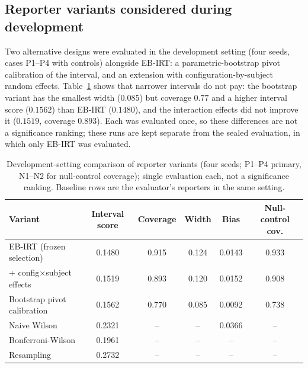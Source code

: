 \documentclass{article}
\begin{document}
\subsection{Reporter variants considered during development}
Two alternative designs were evaluated in the development setting (four seeds, cases P1--P4 with controls) alongside EB-IRT: a parametric-bootstrap pivot calibration of the interval, and an extension with configuration-by-subject random effects. Table~\ref{tab:variants} shows that narrower intervals do not pay: the bootstrap variant has the smallest width ($0.085$) but coverage $0.77$ and a higher interval score ($0.1562$) than EB-IRT ($0.1480$), and the interaction effects did not improve it ($0.1519$, coverage $0.893$). Each was evaluated once, so these differences are not a significance ranking; these runs are kept separate from the sealed evaluation, in which only EB-IRT was evaluated.

\begin{table}[t]
\centering
\caption{Development-setting comparison of reporter variants (four seeds; P1--P4 primary, N1--N2 for null-control coverage); single evaluation each, not a significance ranking. Baseline rows are the evaluator's reporters in the same setting.}
\label{tab:variants}
\small
\begin{tabular}{lccccc}
\toprule
Variant & Interval score & Coverage & Width & Bias & Null-control cov. \\
\midrule
EB-IRT (frozen selection) & 0.1480 & 0.915 & 0.124 & 0.0143 & 0.933 \\
+ config$\times$subject effects & 0.1519 & 0.893 & 0.120 & 0.0152 & 0.908 \\
Bootstrap pivot calibration & 0.1562 & 0.770 & 0.085 & 0.0092 & 0.738 \\
\midrule
Naive Wilson & 0.2321 & -- & -- & 0.0366 & -- \\
Bonferroni-Wilson & 0.1961 & -- & -- & -- & -- \\
Resampling & 0.2732 & -- & -- & -- & -- \\
\bottomrule
\end{tabular}
\end{table}
\end{document}
